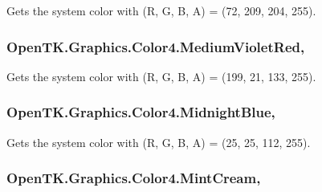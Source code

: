 Gets the system color with (R, G, B, A) = (72, 209, 204, 255). 

\hypertarget{struct_open_t_k_1_1_graphics_1_1_color4_a94934083e6150219fe0b91868ec0f837}{
\subsubsection[{Medium\-Violet\-Red}]{ Open\-T\-K.\-Graphics.\-Color4.\-Medium\-Violet\-Red\hspace{0.3cm}{\ttfamily [static]}, {\ttfamily [get]}}}\label{struct_open_t_k_1_1_graphics_1_1_color4_a94934083e6150219fe0b91868ec0f837}


Gets the system color with (R, G, B, A) = (199, 21, 133, 255). 

\hypertarget{struct_open_t_k_1_1_graphics_1_1_color4_a131e8551c951f5304e2d4c30e7b8ddcc}{
\subsubsection[{Midnight\-Blue}]{ Open\-T\-K.\-Graphics.\-Color4.\-Midnight\-Blue\hspace{0.3cm}{\ttfamily [static]}, {\ttfamily [get]}}}\label{struct_open_t_k_1_1_graphics_1_1_color4_a131e8551c951f5304e2d4c30e7b8ddcc}


Gets the system color with (R, G, B, A) = (25, 25, 112, 255). 

\hypertarget{struct_open_t_k_1_1_graphics_1_1_color4_a28f6f1f7352e1da02a45f83a77506569}{
\subsubsection[{Mint\-Cream}]{ Open\-T\-K.\-Graphics.\-Color4.\-Mint\-Cream\hspace{0.3cm}{\ttfamily [static]}, {\ttfamily [get]}}}\label{struct_open_t_k_1_1_graphics_1_1_color4_a28f6f1f7352e1da02a45f83a77506569}



